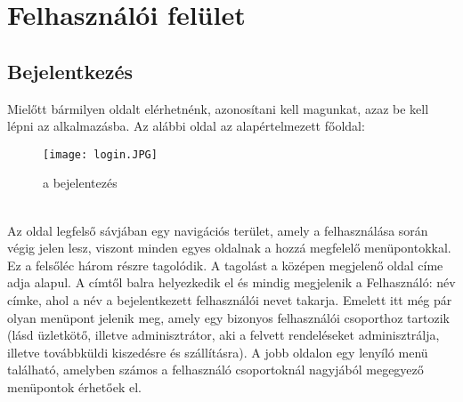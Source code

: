 \section{Felhasználói felület}
\subsection{Bejelentkezés}
Mielőtt bármilyen oldalt elérhetnénk, azonosítani kell magunkat, azaz be kell lépni az alkalmazásba. Az alábbi oldal az alapértelmezett főoldal:
\begin{figure}[h]
    \centering
    \texttt{[image: login.JPG]}
    \caption{a bejelentezés}
\end{figure}
\\
Az oldal legfelső sávjában egy navigációs terület, amely a felhasználása során végig jelen lesz, viszont minden egyes oldalnak a hozzá megfelelő menüpontokkal. Ez a felsőléc három részre tagolódik. A tagolást a középen megjelenő oldal címe adja alapul. A címtől balra helyezkedik el és mindig megjelenik a Felhasználó: név címke, ahol a név a bejelentkezett felhasználói nevet takarja. Emelett itt még pár olyan menüpont jelenik meg, amely egy bizonyos felhasználói csoporthoz tartozik (lásd üzletkötő, illetve adminisztrátor, aki a felvett rendeléseket adminisztrálja, illetve továbbküldi kiszedésre és szállításra). A jobb oldalon egy lenyíló menü található, amelyben számos a felhasználó csoportoknál nagyjából megegyező menüpontok érhetőek el.

